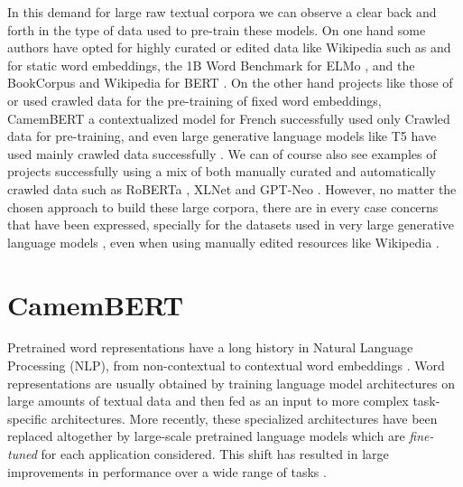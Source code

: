 In this demand for large raw textual corpora we can observe a clear back and forth in the type of data used to pre-train these models. On one hand some authors have opted for highly curated or edited data like Wikipedia such as  and  for static word embeddings, the 1B Word Benchmark \cite{chelba-etal-2014-one} for ELMo \cite{peters-etal-2018-deep}, and the BookCorpus \cite{zhu-etal-2015-aligning} and Wikipedia for BERT \cite{devlin-etal-2019-bert}. On the other hand projects like those of  or  used crawled data for the pre-training of fixed word embeddings, CamemBERT \cite{martin-etal-2020-camembert} a contextualized model for French successfully used only Crawled data for pre-training, and even large generative language models like T5 have used mainly crawled data successfully \cite{raffel-etal-2020-exploring}. We can of course also see examples of projects successfully using a mix of both manually curated and automatically crawled data such as RoBERTa \cite{liu-etal-2019-roberta}, XLNet \cite{yang-etal-2019-xlnet} and GPT-Neo \cite{black-etal-2021-gpt,gao-etal-2020-pile}. However, no matter the chosen approach to build these large corpora, there are in every case concerns that have been expressed, specially for the datasets used in very large generative language models \cite{bender-etal-2021-on}, even when using manually edited resources like Wikipedia \cite{barera-2020-mind}.


\section{CamemBERT}

Pretrained word representations have a long history in Natural Language Processing (NLP), from non-contextual \citep{brown-etal-1992-class,ando-zhang-2005-framework,mikolov-etal-2013-distributed,pennington-etal-2014-glove} to contextual word embeddings \citep{peters-etal-2018-deep,akbik-etal-2018-contextual}. Word representations are usually obtained by training language model architectures on large amounts of textual data and then fed as an input to more complex task-specific architectures. More recently, these specialized architectures have been replaced altogether by large-scale pretrained language models which are \emph{fine-tuned} for each application considered. This shift has resulted in large improvements in performance over a wide range of tasks \cite{devlin-etal-2019-bert,radford-etal-2019-language,liu-etal-2019-roberta,raffel-etal-2020-exploring}.

